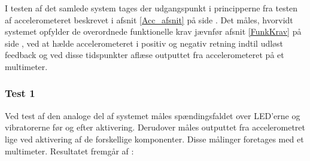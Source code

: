 \noindent I testen af det samlede system tages der udgangspunkt i principperne fra testen af accelerometeret beskrevet i afsnit \ref{Acc_afsnit} på side \pageref{Acc_afsnit}. Det måles, hvorvidt systemet opfylder de overordnede funktionelle krav jævnfør afsnit \ref{FunkKrav} på side \pageref{FunkKrav}, ved at hælde accelerometeret i positiv og negativ retning indtil udløst feedback og ved disse tidspunkter aflæse outputtet fra accelerometeret på et multimeter.
\subsubsection{Test 1}
Ved test af den analoge del af systemet måles spændingsfaldet over LED'erne og vibratorerne før og efter aktivering. Derudover måles outputtet fra accelerometret lige ved aktivering af de forskellige komponenter. Disse målinger foretages med et multimeter. Resultatet fremgår af :
